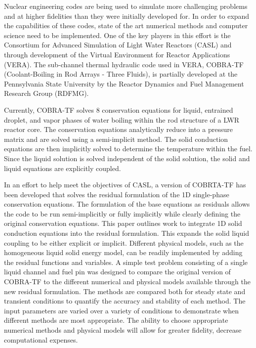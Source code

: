 Nuclear engineering codes  are being used to simulate more challenging problems
and at higher fidelities  than they were initially developed for. In order to
expand the capabilities of  these codes, state of the art numerical methods and
computer science need to be  implemented. One of the key players in this effort
is the Consortium for Advanced  Simulation of Light Water Reactors (CASL) and
through development of the  Virtual Environment for Reactor Applications (VERA).
The sub-channel thermal  hydraulic code used in VERA, COBRA-TF (Coolant-Boiling
in Rod Arrays - Three  Fluids), is partially developed at the Pennsylvania State
University by the Reactor  Dynamics and Fuel Management Research Group (RDFMG).

Currently, COBRA-TF solves 8  conservation equations for liquid, entrained
droplet, and vapor phases of  water boiling within the rod structure of a LWR
reactor core. The conservation  equations analytically reduce into a pressure
matrix and are solved using a  semi-implicit method. The solid conduction
equations are then implicitly  solved to determine the temperature within the
fuel. Since the liquid solution  is solved independent of the solid solution,
the solid and liquid equations are explicitly coupled.

In an effort to help meet the objectives of CASL,  a version of COBRTA-TF has
been developed that solves the residual formulation  of the 1D single-phase
conservation equations. The formulation of the base  equations as residuals
allows the code to be run semi-implicitly or fully  implicitly while clearly
defining the original conservation equations. This  paper outlines work to
integrate 1D solid conduction equations into the  residual formulation. This
expands the solid liquid coupling to be either  explicit or implicit. Different
physical models, such as the homogeneous liquid  solid energy model, can be
readily implemented by adding the residual  functions and variables. A simple
test problem consisting of a single liquid  channel and fuel pin was designed to
compare the original version of COBRA-TF to  the different numerical and
physical models available through the new  residual formulation. The methods are
compared both for steady state and transient  conditions to quantify the
accuracy and stability of each method. The input  parameters are varied over a
variety of conditions to demonstrate when different  methods are most
appropriate. The ability to choose appropriate numerical  methods and physical
models will allow for greater fidelity, decrease computational expenses.
